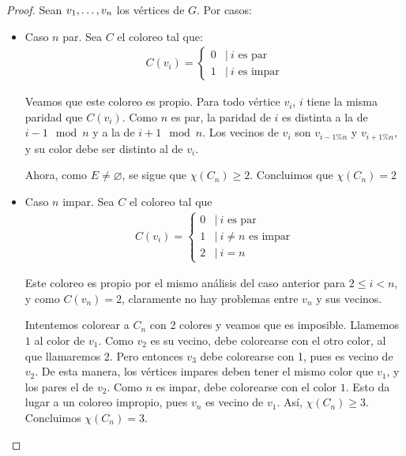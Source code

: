 \begin{proof}
  Sean $v_1, \mathellipsis, v_n$ los vértices de $G$. Por casos:
  \begin{itemize}
  \item Caso $n$ par. Sea $C$ el coloreo tal que: 
    \begin{align}
      C(v_i) =
      \begin{cases}
        0 & |\ \text{$i$ es par}\\
        1 & |\ \text{$i$ es impar}
      \end{cases}
    \end{align}
    
    Veamos que este coloreo es propio. Para todo vértice $v_{i}$, $i$ tiene la
    misma paridad que $C(v_{i})$. Como $n$ es par, la paridad de $i$ es
    distinta a la de $i-1 \mod{n}$ y a la de $i+1 \mod{n}$. Los vecinos de
    $v_{i}$ son $v_{i-1 \% n}$ y $v_{i+1 \% n}$, y su color debe ser distinto
    al de $v_{i}$.

    Ahora, como $E \neq \varnothing$, se sigue que $\chi(C_n) \ge 2$.
    Concluimos que $\chi(C_n) = 2$

  \item Caso $n$ impar. Sea $C$ el coloreo tal que
    \begin{align}
      C(v_i) =
      \begin{cases} 
        0  & |\ \text{$i$ es par}\\
        1  & |\ \text{$i \neq n$ es impar}\\
        2  & |\ i = n 
      \end{cases}
    \end{align}

    Este coloreo es propio por el mismo análisis del caso anterior para
    $2 \le i < n$, y como $C(v_{n}) = 2$, claramente no hay problemas
    entre $v_{n}$ y sus vecinos.

    Intentemos colorear a $ C_{n}$ con 2 colores y veamos que es imposible.
    Llamemos $1$ al color de $v_{1}$. Como $v_{2}$ es su vecino, debe
    colorearse con el otro color, al que llamaremos $2$. Pero entonces
    $v_{3}$ debe colorearse con 1, pues es vecino de $v_{2}$. De esta manera,
    los vértices impares deben tener el mismo color que $v_{1}$, y los pares
    el de $v_{2}$. Como $n$ es impar, debe colorearse con el color $1$.
    Esto da lugar a un coloreo impropio, pues $v_{n}$ es vecino de $v_{1}$.
    Así, $\chi(C_{n}) \ge 3$. Concluimos $\chi(C_n) = 3$.
  \end{itemize}
\end{proof}

